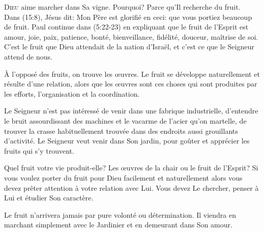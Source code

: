 \dvrule








\lettrine{D}{ieu} aime marcher dans Sa vigne.
 Pourquoi? Parce qu'Il recherche du fruit. \\[1ex]
Dans (15:8), Jésus dit: 
 \Og Mon Père est glorifié en ceci: que vous portiez beaucoup de fruit. \Fg{}
 Paul continue dans (5:22-23) en expliquant que le fruit
 de l'Esprit est \Og amour, joie, paix, patience, bonté, bienveillance,
 fidélité, douceur, maîtrise de soi. \Fg{}
 C'est le fruit que Dieu attendait de la nation d'Israël,
 et c'est ce que le Seigneur attend de nous.


À l'opposé des fruits, on trouve les \oe{}uvres.
 Le fruit se développe naturellement et résulte d'une relation,
 alors que les \oe{}uvres sont ces choses qui sont produites par les efforts,
 l'organisation et la coordination.

Le Seigneur n'est pas intéressé de venir dans une fabrique industrielle,
 d'entendre le bruit assourdissant des machines et le vacarme de l'acier qu'on martelle,
 de trouver la crasse habituellement trouvée dans des endroits
 aussi grouillants d'activité.
 Le Seigneur veut venir dans Son jardin, pour goûter et apprécier
 les fruits qui s'y trouvent.

Quel fruit votre vie produit-elle? Les \oe{}uvres de la chair
 ou le fruit de l'Esprit? Si vous voulez porter du fruit pour Dieu
 \ocadr facilement et naturellement \fcadr{} alors vous devez prêter
 attention à votre relation avec Lui. Vous devez Le chercher,
 penser à Lui et étudier Son caractère.

Le fruit n'arrivera jamais par pure volonté ou détermination.
 Il viendra en marchant simplement avec le Jardinier
 et en demeurant dans Son amour.

